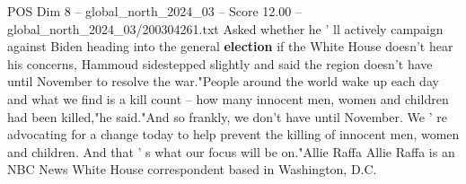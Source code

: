 \begin{textsample}{POS Dim 8 – global\_north\_2024\_03 – Score 12.00 – global\_north\_2024\_03/200304261.txt}
Asked whether he ' ll actively campaign against Biden heading into the general \textbf{election} if the White House doesn't hear his concerns, Hammoud sidestepped slightly and said the region doesn't have until November to resolve the war."People around the world wake up each day and what we find is a kill count -- how many innocent men, women and children had been killed,"he said."And so frankly, we don't have until November.
We ' re advocating for a change today to help prevent the killing of innocent men, women and children.
And that ' s what our focus will be on."Allie Raffa Allie Raffa is an NBC News White House correspondent based in Washington, D.C.

\end{textsample}
